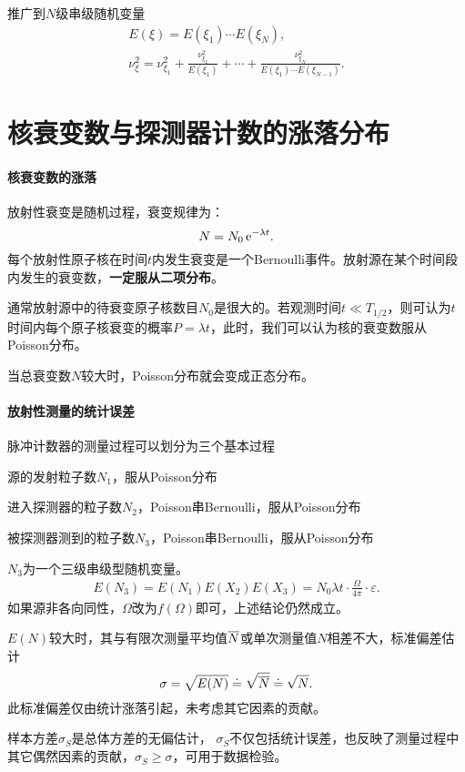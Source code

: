 推广到$N$级串级随机变量
\begin{gather*}
	E(\xi)=E(\xi_1)\cdots E(\xi_N),\\
	\nu_\xi^2=\nu_{\xi_1}^2+\frac{\nu_{\xi_2}^2}{E(\xi_1)}+\cdots+\frac{\nu_{\xi_N}^2}{E(\xi_1)\cdots E(\xi_{N-1})}.
\end{gather*}

\section{核衰变数与探测器计数的涨落分布}

\paragraph{核衰变数的涨落}
放射性衰变是随机过程，衰变规律为：
\[
	N=N_0\mathop{}\!\mathrm{e}^{-\lambda t}.
\]
每个放射性原子核在时间$t$内发生衰变是一个Bernoulli事件。放射源在某个时间段内发生的衰变数，\textbf{一定服从二项分布}。

通常放射源中的待衰变原子核数目$N_0$是很大的。若观测时间$t\ll T_{1/2}$，则可认为$t$时间内每个原子核衰变的概率$P=\lambda t$，此时，我们可以认为核的衰变数服从Poisson分布。

当总衰变数$ N $较大时，Poisson分布就会变成正态分布。
\paragraph{放射性测量的统计误差}
脉冲计数器的测量过程可以划分为三个基本过程
\begin{compactitem}
	\item 源的发射粒子数$N_1$，服从Poisson分布
	\item 进入探测器的粒子数$N_2$，Poisson串Bernoulli，服从Poisson分布
	\item 被探测器测到的粒子数$N_3$，Poisson串Bernoulli，服从Poisson分布
\end{compactitem}
$N_3$为一个三级串级型随机变量。
\begin{align}\label{detector-expect}
	E(N_3)=E(N_1)E(X_2)E(X_3)=N_0\lambda t\cdot\frac{\Omega}{4\pi}\cdot\varepsilon.
\end{align}
如果源非各向同性，$\Omega$改为$f(\Omega)$即可，上述结论仍然成立。%

$E(N)$较大时，其与有限次测量平均值$\overline{N}$或单次测量值$N$相差不大，标准偏差估计
\[
	\sigma=\sqrt{E(N)}\doteq\sqrt{\overline{N}}\doteq\sqrt N.
\]
此标准偏差仅由统计涨落引起，未考虑其它因素的贡献。

样本方差$\sigma_S$是总体方差的无偏估计，%
$\sigma_S$不仅包括统计误差，也反映了测量过程中其它偶然因素的贡献，$\sigma_S\geqslant\sigma$，可用于数据检验。

